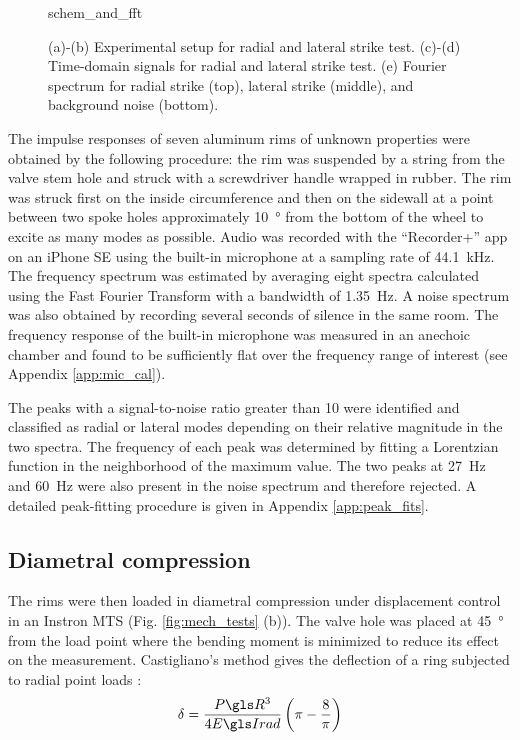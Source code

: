 \documentclass[../thesis.tex]{subfiles}
\begin{document}
\begin{figure}
\centering
{schem_and_fft}
\caption[Acoustic test on a rim]{(a)-(b) Experimental setup for radial and lateral strike test. (c)-(d) Time-domain signals for radial and lateral strike test. (e) Fourier spectrum for radial strike (top), lateral strike (middle), and background noise (bottom).}
\label{fig:schem}
\end{figure}

The impulse responses of seven aluminum rims of unknown properties were obtained by the following procedure: the rim was suspended by a string from the valve stem hole and struck with a screwdriver handle wrapped in rubber. The rim was struck first on the inside circumference and then on the sidewall at a point between two spoke holes approximately \SI{10}{\degree} from the bottom of the wheel to excite as many modes as possible. Audio was recorded with the ``Recorder+'' app on an iPhone SE using the built-in microphone at a sampling rate of \SI{44.1}{kHz}. The frequency spectrum was estimated by averaging eight spectra calculated using the Fast Fourier Transform with a bandwidth of \SI{1.35}{Hz}. A noise spectrum was also obtained by recording several seconds of silence in the same room. The frequency response of the built-in microphone was measured in an anechoic chamber and found to be sufficiently flat over the frequency range of interest (see Appendix \ref{app:mic_cal}).

The peaks with a signal-to-noise ratio greater than 10 were identified and classified as radial or lateral modes depending on their relative magnitude in the two spectra. The frequency of each peak was determined by fitting a Lorentzian function in the neighborhood of the maximum value. The two peaks at \SI{27}{Hz} and \SI{60}{Hz} were also present in the noise spectrum and therefore rejected. A detailed peak-fitting procedure is given in Appendix \ref{app:peak_fits}.

\subsection{Diametral compression}
The rims were then loaded in diametral compression under displacement control in an Instron MTS (Fig. \ref{fig:mech_tests} (b)). The valve hole was placed at \SI{45}{\degree} from the load point where the bending moment is minimized to reduce its effect on the measurement. Castigliano's method gives the deflection of a ring subjected to radial point loads \cite{Timoshenko1961}:
\begin{equation}\label{eq:def_rad}
\delta = \frac{P\R^3}{4\EIr} \left(\pi-\frac{8}{\pi} \right)
\end{equation}
\end{document}
